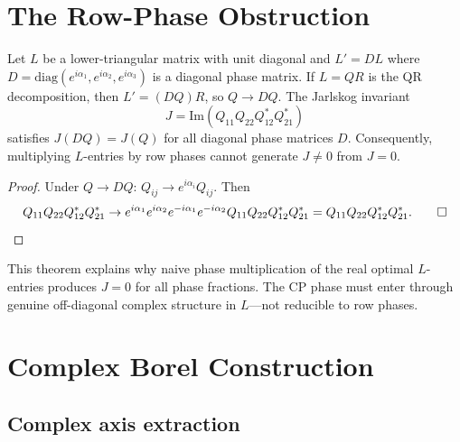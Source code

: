 ﻿\documentclass[epjc3]{svjour3}
\begin{document}
\section{The Row-Phase Obstruction}
\label{sec:obstruction}

\begin{proposition}
\label{prop:rowphase}
Let $L$ be a lower-triangular matrix with unit diagonal and
$L' = DL$ where $D = \mathrm{diag}(e^{i\alpha_1}, e^{i\alpha_2},
e^{i\alpha_3})$ is a diagonal phase matrix.  If $L = QR$ is the QR
decomposition, then $L' = (DQ)R$, so $Q \to DQ$.  The Jarlskog
invariant
\begin{equation}
  J = \mathrm{Im}(Q_{11} Q_{22} Q_{12}^* Q_{21}^*)
  \label{eq:jarlskog}
\end{equation}
satisfies $J(DQ) = J(Q)$ for all diagonal phase matrices $D$.
Consequently, multiplying $L$-entries by row phases cannot generate
$J \neq 0$ from $J = 0$.
\end{proposition}

\begin{proof}
Under $Q \to DQ$: $Q_{ij} \to e^{i\alpha_i} Q_{ij}$.  Then
\begin{equation*}
  Q_{11} Q_{22} Q_{12}^* Q_{21}^*
  \to e^{i\alpha_1} e^{i\alpha_2} e^{-i\alpha_1} e^{-i\alpha_2}
     Q_{11} Q_{22} Q_{12}^* Q_{21}^*
  = Q_{11} Q_{22} Q_{12}^* Q_{21}^*.  \qed
\end{equation*}
\end{proof}

This theorem explains why naive phase multiplication of the real
optimal $L$-entries produces $J = 0$ for all phase fractions.  The CP
phase must enter through genuine off-diagonal complex structure in
$L$---not reducible to row phases.

\section{Complex Borel Construction}
\label{sec:complex}

\subsection{Complex axis extraction}
\label{subsec:complexaxis}
\end{document}

